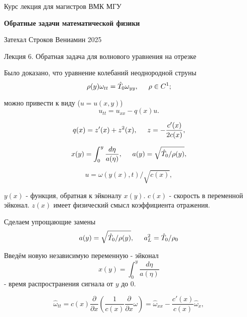 \documentclass{article}
\begin{document}
\centerline{\large Курс лекция для магистров ВМК МГУ}
\centerline {\textbf{\LARGE Обратные задачи математической физики}}
\centerline {Затехал Строков Вениамин 2025}

\vspace{0.4cm}

\centerline{\LARGE 	Лекция 6. Обратная задача для волнового уравнения на отрезке}

\vspace{0.5cm}

Было доказано, что уравнение колебаний неоднородной струны
\begin{equation}
\rho(y) \omega_{tt} = \hat{T}_0 \omega_{yy}, \hspace{0.5cm} \rho \in C^1;
\end{equation}

можно привести к виду ($u = u(x,y)$)
\begin{equation}
u_{tt} = u_{xx} - q(x) u.
\end{equation}

\begin{equation*}
q(x) = z'(x) + z^2(x), \hspace{0.5cm} z = -\dfrac{c'(x)}{2 c(x)},
\end{equation*}

\begin{equation*}
x(y) = \int_0^y \dfrac{d \eta}{a(\eta)}, \hspace{0.5cm} a(y) = \sqrt{\hat{T}_0/ \rho(y)},
\end{equation*}

\begin{equation}
u = \omega(y(x),t)/ \sqrt{c(x)}, 
\end{equation}

$y(x)$ - функция, обратная к эйконалу $x(y)$. $c(x)$ - скорость в переменной эйконал. $z(x)$ имеет физический смысл коэффициента отражения.

Сделаем упрощающие замены
\begin{equation*}
a(y) = \sqrt{\hat{T}_0/ \rho(y)}, \hspace{0.5cm} a_L^2 = \hat{T}_0 / \rho_0
\end{equation*}

Введём новую независимую переменную - эйконал
\begin{equation*}
 x(y) = \int_0^y \dfrac{d \eta}{a(\eta)}
\end{equation*}
 - время распространения сигнала от $y$ до 0.
 
\begin{equation}
\hat{\omega}_{tt} = c(x) \dfrac{\partial}{\partial x} \left(\dfrac{1}{c(x)} \dfrac{\partial}{\partial x} \omega \right) = \hat{\omega}_{xx} - \dfrac{c'(x)}{c(x)} \hat{\omega}_x,
\end{equation}
\end{document}
